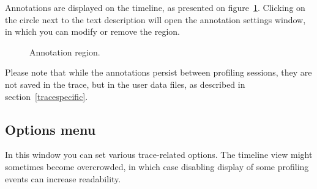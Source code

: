 \documentclass[hidelinks,titlepage,a4paper]{article}
\begin{document}
Annotations are displayed on the timeline, as presented on figure~\ref{annotation}. Clicking on the circle next to the text description will open the annotation settings window, in which you can modify or remove the region.

\begin{figure}[h]
\centering{}
\caption{Annotation region.}
\label{annotation}
\end{figure}

Please note that while the annotations persist between profiling sessions, they are not saved in the trace, but in the user data files, as described in section~\ref{tracespecific}.

\subsection{Options menu}
\label{options}

In this window you can set various trace-related options. The timeline view might sometimes become overcrowded, in which case disabling display of some profiling events can increase readability.
\end{document}
